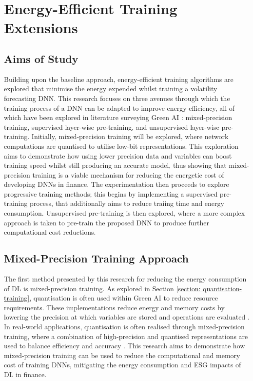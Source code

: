 \documentclass[a4paper, 11pt]{report}
\begin{document}
    \section{Energy-Efficient Training Extensions}
    \label{section: energy-extensions}

    \subsection{Aims of Study}

    Building upon the baseline approach, energy-efficient training algorithms are explored that minimise the energy expended whilst training a volatility forecasting DNN. This research focuses on three avenues through which the training process of a DNN can be adapted to improve energy efficiency, all of which have been explored in literature surveying Green AI \citep{xu-2021}: mixed-precision training, supervised layer-wise pre-training, and unsupervised layer-wise pre-training. Initially, mixed-precision training will be explored, where network computations are quantised to utilise low-bit representations. This exploration aims to demonstrate how using lower precision data and variables can boost training speed whilst still producing an accurate model, thus showing that mixed-precision training is a viable mechanism for reducing the energetic cost of developing DNNs in finance. The experimentation then proceeds to explore progressive training methods; this begins by implementing a supervised pre-training process, that additionally aims to reduce traiing time and energy consumption. Unsupervised pre-training is then explored, where a more complex approach is taken to pre-train the proposed DNN to produce further computational cost reductions.


    \subsection{Mixed-Precision Training Approach}
    \label{section: mixed-precision-method}

    The first method presented by this research for reducing the energy consumption of DL is mixed-precision training. As explored in Section \ref{section: quantisation-training}, quantisation is often used within Green AI to reduce resource requirements. These implementations reduce energy and memory costs by lowering the precision at which variables are stored and operations are evaluated \citep{fan-2020b}. In real-world applications, quantisation is often realised through mixed-precision training, where a combination of high-precision and quantised representations are used to balance efficiency and accuracy \citep{ott-2017}. This research aims to demonstrate how mixed-precision training can be used to reduce the computational and memory cost of training DNNs, mitigating the energy consumption and ESG impacts of DL in finance.
\end{document}
